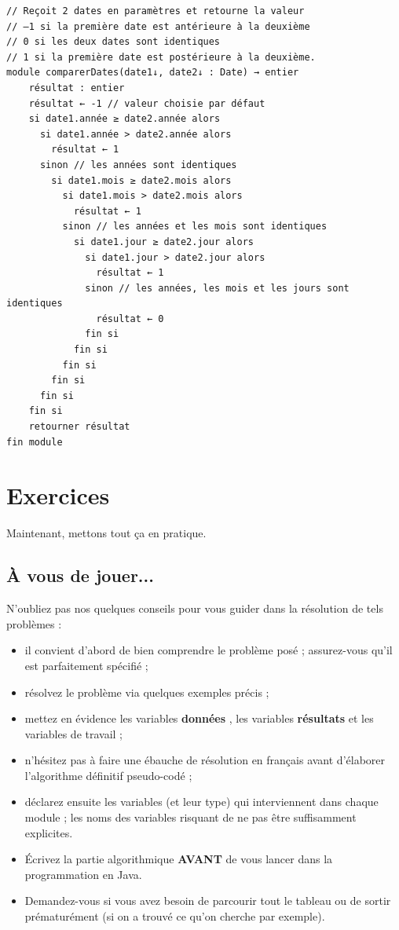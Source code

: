\documentclass[11pt,a4paper]{article}
\begin{document}
            \par
        \begin{verbatim}
// Reçoit 2 dates en paramètres et retourne la valeur
// –1 si la première date est antérieure à la deuxième
// 0 si les deux dates sont identiques
// 1 si la première date est postérieure à la deuxième.
module comparerDates(date1↓, date2↓ : Date) → entier
    résultat : entier
    résultat ← -1 // valeur choisie par défaut
    si date1.année ≥ date2.année alors
      si date1.année > date2.année alors
        résultat ← 1
      sinon // les années sont identiques
        si date1.mois ≥ date2.mois alors
          si date1.mois > date2.mois alors
            résultat ← 1
          sinon // les années et les mois sont identiques
            si date1.jour ≥ date2.jour alors
              si date1.jour > date2.jour alors
                résultat ← 1
              sinon // les années, les mois et les jours sont identiques
                résultat ← 0
              fin si
            fin si
          fin si
        fin si
      fin si
    fin si
    retourner résultat
fin module
      \end{verbatim}\section{Exercices}
				Maintenant, mettons tout \c ca en pratique.
      
            \par
        \subsection{\`A vous de jouer...}
      N'oubliez pas nos quelques conseils pour vous guider dans la r\'esolution de tels probl\`emes :
      
					\begin{itemize}
				
			\item il convient d'abord de bien comprendre le probl\`eme pos\'e ; assurez-vous qu'il est parfaitement sp\'ecifi\'e ;
			\item r\'esolvez le probl\`eme via quelques exemples pr\'ecis ;
			\item mettez en \'evidence les variables \textbf{\guillemotleft  donn\'ees \guillemotright }, les variables \textbf{\guillemotleft  r\'esultats \guillemotright } et les variables de travail ;
			\item n'h\'esitez pas \`a faire une \'ebauche de r\'esolution en fran\c cais avant d'\'elaborer l'algorithme d\'efinitif pseudo-cod\'e ;
			\item d\'eclarez ensuite les variables (et leur type) qui interviennent dans chaque module ; les noms des variables risquant de ne pas \^etre suffisamment explicites.
			\item \'Ecrivez la partie algorithmique \textbf{AVANT} de vous lancer dans la programmation en Java.
			\item Demandez-vous si vous avez besoin de parcourir tout le tableau ou de sortir pr\'ematur\'ement (si on a trouv\'e ce qu'on cherche par exemple).
					\end{itemize}
				
\end{document}
